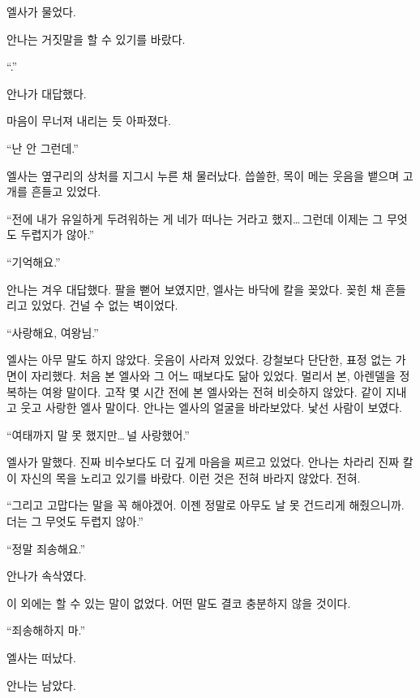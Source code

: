 엘사가 물었다.

안나는 거짓말을 할 수 있기를 바랐다.

``.''

안나가 대답했다.

마음이 무너져 내리는 듯 아파졌다.

``난 안 그런데.''

엘사는 옆구리의 상처를 지그시 누른 채 물러났다. 씁쓸한, 목이 메는 웃음을 뱉으며 고개를 흔들고 있었다.

``전에 내가 유일하게 두려워하는 게 네가 떠나는 거라고 했지\ldots\,그런데 이제는 그 무엇도 두렵지가 않아.''

``기억해요.''

안나는 겨우 대답했다. 팔을 뻗어 보였지만, 엘사는 바닥에 칼을 꽂았다. 꽂힌 채 흔들리고 있었다. 건널 수 없는 벽이었다.

``사랑해요, 여왕님.''

엘사는 아무 말도 하지 않았다. 웃음이 사라져 있었다. 강철보다 단단한, 표정 없는 가면이 자리했다. 처음 본 엘사와 그 어느 때보다도 닮아 있었다. 멀리서 본, 아렌델을 정복하는 여왕 말이다. 고작 몇 시간 전에 본 엘사와는 전혀 비슷하지 않았다. 같이 지내고 웃고 사랑한 엘사 말이다. 안나는 엘사의 얼굴을 바라보았다. 낯선 사람이 보였다.

``여태까지 말 못 했지만\ldots\,널 사랑했어.''

엘사가 말했다. 진짜 비수보다도 더 깊게 마음을 찌르고 있었다. 안나는 차라리 진짜 칼이 자신의 목을 노리고 있기를 바랐다. 이런 것은 전혀 바라지 않았다. 전혀.

``그리고 고맙다는 말을 꼭 해야겠어. 이젠 정말로 아무도 날 못 건드리게 해줬으니까. 더는 그 무엇도 두렵지 않아.''

``정말 죄송해요.''

안나가 속삭였다.

이 외에는 할 수 있는 말이 없었다. 어떤 말도 결코 충분하지 않을 것이다.

``죄송해하지 마.''

엘사는 떠났다.

안나는 남았다.

